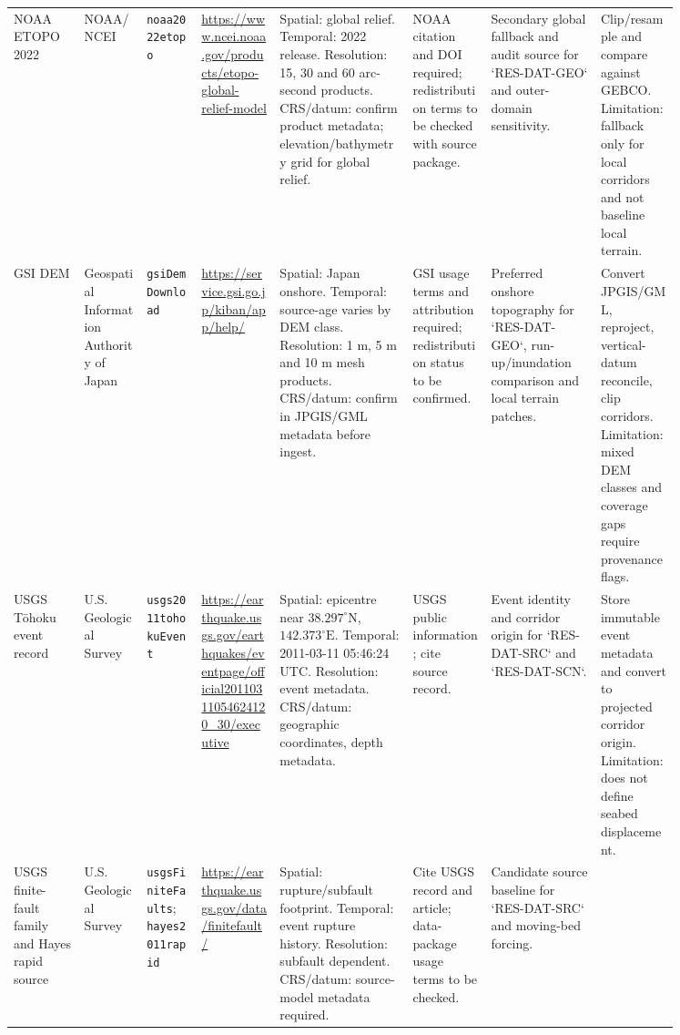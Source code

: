 \begin{landscape}
\begin{longtable}{
    p{0.09\linewidth}
    p{0.08\linewidth}
    p{0.07\linewidth}
    p{0.10\linewidth}
    p{0.17\linewidth}
    p{0.10\linewidth}
    p{0.14\linewidth}
    p{0.10\linewidth}
  }
  \\
  NOAA ETOPO 2022
  &
  NOAA/NCEI
  &
  \texttt{noaa2022etopo}
  &
  \url{https://www.ncei.noaa.gov/products/etopo-global-relief-model}
  &
  Spatial: global relief. Temporal: 2022 release. Resolution: 15, 30 and 60 arc-second products. CRS/datum: confirm product metadata; elevation/bathymetry grid for global relief.
  &
  NOAA citation and DOI required; redistribution terms to be checked with source package.
  &
  Secondary global fallback and audit source for `RES-DAT-GEO` and outer-domain sensitivity.
  &
  Clip/resample and compare against GEBCO. Limitation: fallback only for local corridors and not baseline local terrain.
  \\
  GSI DEM
  &
  Geospatial Information Authority of Japan
  &
  \texttt{gsiDemDownload}
  &
  \url{https://service.gsi.go.jp/kiban/app/help/}
  &
  Spatial: Japan onshore. Temporal: source-age varies by DEM class. Resolution: 1 m, 5 m and 10 m mesh products. CRS/datum: confirm in JPGIS/GML metadata before ingest.
  &
  GSI usage terms and attribution required; redistribution status to be confirmed.
  &
  Preferred onshore topography for `RES-DAT-GEO`, run-up/inundation comparison and local terrain patches.
  &
  Convert JPGIS/GML, reproject, vertical-datum reconcile, clip corridors. Limitation: mixed DEM classes and coverage gaps require provenance flags.
  \\
  USGS Tōhoku event record
  &
  U.S. Geological Survey
  &
  \texttt{usgs2011tohokuEvent}
  &
  \url{https://earthquake.usgs.gov/earthquakes/eventpage/official20110311054624120_30/executive}
  &
  Spatial: epicentre near $38.297^{\circ}\mathrm{N}$, $142.373^{\circ}\mathrm{E}$. Temporal: 2011-03-11 05:46:24 UTC. Resolution: event metadata. CRS/datum: geographic coordinates, depth metadata.
  &
  USGS public information; cite source record.
  &
  Event identity and corridor origin for `RES-DAT-SRC` and `RES-DAT-SCN`.
  &
  Store immutable event metadata and convert to projected corridor origin. Limitation: does not define seabed displacement.
  \\
  USGS finite-fault family and Hayes rapid source
  &
  U.S. Geological Survey
  &
  \texttt{usgsFiniteFaults}; \texttt{hayes2011rapid}
  &
  \url{https://earthquake.usgs.gov/data/finitefault/}
  &
  Spatial: rupture/subfault footprint. Temporal: event rupture history. Resolution: subfault dependent. CRS/datum: source-model metadata required.
  &
  Cite USGS record and article; data-package usage terms to be checked.
  &
  Candidate source baseline for `RES-DAT-SRC` and moving-bed forcing.

\end{longtable}
\end{landscape}
